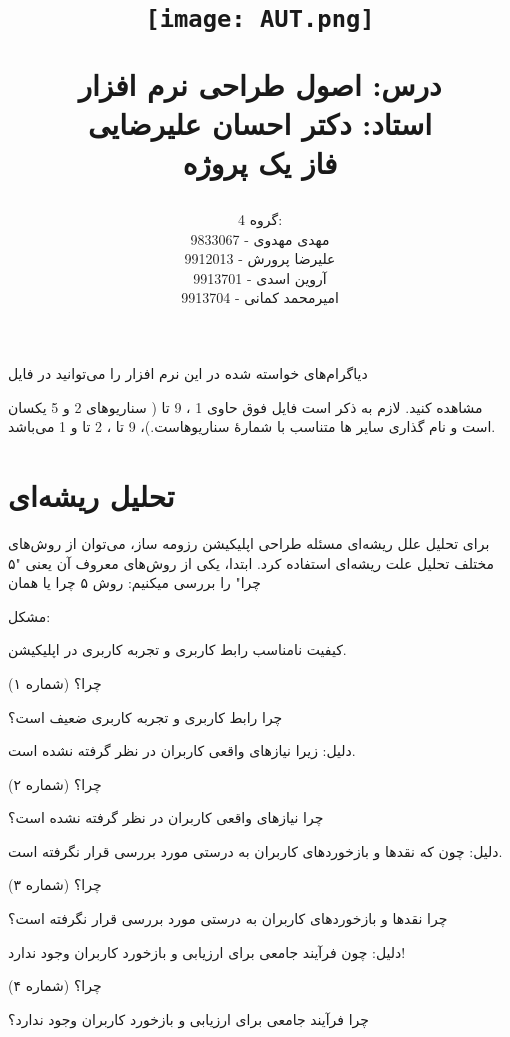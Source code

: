 \documentclass[]{article}
\title{
	\begin{center}
		\texttt{[image: AUT.png]}
	\end{center}	
	
	\LARGE
	درس: اصول طراحی نرم افزار \\
	\Large
	استاد: دکتر احسان علیرضایی \\
	\Large
	فاز یک پروژه
	
}
\author{
	گروه 4: \\
	مهدی مهدوی - 9833067 \\
	علیرضا پرورش - 9912013 \\
	آروین اسدی - 9913701 \\
	امیرمحمد کمانی - 9913704
}
\begin{document}
	\maketitle
	\thispagestyle{empty}
	\newpage
	\tableofcontents
	\newpage
	
	\fontsize{12pt}{14pt}
	\LARGE
	
	\section{\huge{}}
		دیاگرام‌های خواسته شده در این نرم افزار را می‌توانید در فایل 
		
		مشاهده کنید. لازم به ذکر است فایل فوق حاوی 1 
		،
		9 تا 
		( 
		سناریوهای 2 و 5 یکسان است و نام گذاری سایر 
		ها
		متناسب با شمارۀ سناریوهاست.)، 9 تا 
		،
		2 تا 
		 و 
		1  
		می‌باشد.
		
	\section{\huge{تحلیل ریشه‌ای}}
	برای تحلیل علل ریشه‌ای مسئله طراحی اپلیکیشن رزومه ساز، می‌توان از روش‌های مختلف تحلیل علت ریشه‌ای استفاده کرد.
	ابتدا، یکی از روش‌های معروف آن یعنی "۵ چرا" را بررسی میکنیم:
	روش ۵ چرا یا همان
	
	مشکل:
	
	کیفیت نامناسب رابط کاربری و تجربه کاربری در اپلیکیشن.
	
	چرا؟ (شماره ۱)
	
	چرا رابط کاربری و تجربه کاربری ضعیف است؟
	
	دلیل: زیرا نیازهای واقعی کاربران در نظر گرفته نشده است.
	
	چرا؟ (شماره ۲)
	
	چرا نیازهای واقعی کاربران در نظر گرفته نشده است؟
	
	دلیل: چون که نقدها و بازخوردهای کاربران به درستی مورد بررسی قرار نگرفته است.
	
	چرا؟ (شماره ۳)
	
	چرا نقدها و بازخوردهای کاربران به درستی مورد بررسی قرار نگرفته است؟
	
	دلیل: چون فرآیند جامعی برای ارزیابی و بازخورد کاربران وجود ندارد!
	
	چرا؟ (شماره ۴)
	
	چرا فرآیند جامعی برای ارزیابی و بازخورد کاربران وجود ندارد؟
	
\end{document}

